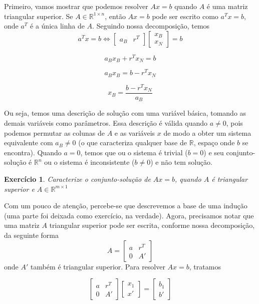 \documentclass[]{article}
\newtheorem{exercicio}{Exercício}
\numberwithin{equation}{section}
\begin{document}
Primeiro, vamos mostrar que podemos resolver $Ax = b$ quando $A$ é uma matriz triangular superior. Se $A \in \mathbb{R}^{1 \times n}$, então $Ax = b$ pode ser escrito como $a^T x = b$, onde $a^T$ é a única linha de $A$. Seguindo nossa decomposição, temos
$$
a^T x = b \iff
\begin{bmatrix}
a_B & r^T
\end{bmatrix}
\begin{bmatrix}
x_B \\
x_N
\end{bmatrix}
= b
$$

$$
a_B x_B + r^T x_N = b
$$

$$
a_B x_B = b - r^T x_N
$$

$$
x_B = \frac{b - r^T x_N}{a_B}
$$

Ou seja, temos uma descrição de solução com uma variável básica, tomando as demais variáveis como parâmetros. Essa descrição é válida quando $a \neq 0$, pois podemos permutar as colunas de $A$ e as variáveis $x$ de modo a obter um sistema equivalente com $a_B \neq 0$ (o que caracteriza qualquer base de $\mathbb{R}$, espaço onde $b$ se encontra). Quando $a = 0$, temos que ou o sistema é trivial ($b = 0$) e seu conjunto-solução é $\mathbb{R}^n$ ou o sistema é inconsistente ($b \neq 0$) e não tem solução.

\begin{exercicio}
	Caracterize o conjunto-solução de $Ax = b$, quando $A$ é triangular superior e $A \in \mathbb{R}^{m \times 1}$
\end{exercicio}

Com um pouco de atenção, percebe-se que descrevemos a base de uma indução (uma parte foi deixada como exercício, na verdade). Agora, precisamos notar que uma matriz $A$ triangular superior pode ser escrita, conforme nossa decomposição, da seguinte forma
$$
A =
\begin{bmatrix}
a & r^T \\
0 & A'
\end{bmatrix}
$$
onde $A'$ também é triangular superior. Para resolver $Ax = b$, tratamos

$$
\begin{bmatrix}
a & r^T \\
0 & A'
\end{bmatrix}
\begin{bmatrix}
x_1 \\
x'
\end{bmatrix}
=
\begin{bmatrix}
b_1 \\
b'
\end{bmatrix}
$$
\end{document}
